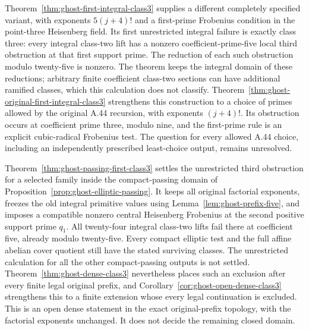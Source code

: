 Theorem~\ref{thm:ghost-first-integral-class3} supplies a
different completely specified variant, with exponents
\(5(j+4)!\) and a first-prime Frobenius condition in the
point-three Heisenberg field. Its first unrestricted integral
failure is exactly class three: every integral class-two lift
has a nonzero coefficient-prime-five local third obstruction
at that first support prime. The reduction of each such
obstruction modulo twenty-five is nonzero. The theorem keeps
the integral domain of these reductions; arbitrary finite
coefficient class-two sections can have additional ramified
classes, which this calculation does not classify.
Theorem~\ref{thm:ghost-original-first-integral-class3}
strengthens this construction to a choice of primes allowed
by the original A.44 recursion, with exponents \((j+4)!\).
Its obstruction occurs at coefficient prime three, modulo
nine, and the first-prime rule is an explicit cubic-radical
Frobenius test. The question for every allowed A.44 choice,
including an independently prescribed least-choice output,
remains unresolved.

Theorem~\ref{thm:ghost-passing-first-class3} settles
the unrestricted third obstruction for a selected family
inside the compact-passing domain of
Proposition~\ref{prop:ghost-elliptic-passing}. It keeps
all original factorial exponents, freezes the old
integral primitive values using
Lemma~\ref{lem:ghost-prefix-five}, and imposes a
compatible nonzero central Heisenberg Frobenius at
the second positive support prime \(q_1\).
All twenty-four integral class-two lifts fail there
at coefficient five, already modulo twenty-five.
Every compact elliptic test and the full affine
abelian cover quotient still have the stated surviving
classes. The unrestricted calculation for all the
other compact-passing outputs is not settled.
Theorem~\ref{thm:ghost-dense-class3} nevertheless places such
an exclusion after every finite legal original prefix,
and Corollary~\ref{cor:ghost-open-dense-class3} strengthens
this to a finite extension whose every legal continuation
is excluded. This is an open dense statement in the exact
original-prefix topology, with the factorial exponents
unchanged. It does not decide the remaining closed domain.

